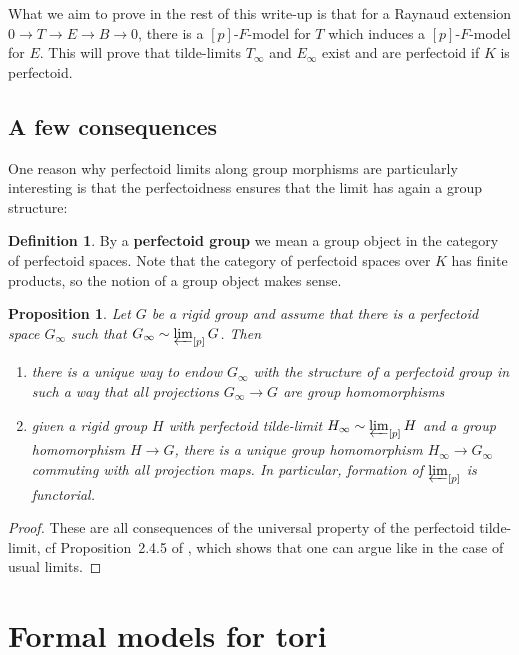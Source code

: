 \documentclass[10pt,oneside]{amsart}
\newtheorem{proposition}[theorem]{Proposition}
\theoremstyle{definition}
\newtheorem{definition}[theorem]{Definition}
\theoremstyle{remark}
\begin{document}
	
	What we aim to prove in the rest of this write-up is that for a Raynaud extension $0\rightarrow T\rightarrow E\rightarrow B\rightarrow 0$, there is a $[p]$-$F$-model for $T$ which induces a $[p]$-$F$-model for $E$. This will prove that tilde-limits $T_\infty$ and $E_\infty$ exist and are perfectoid if $K$ is perfectoid.
	
	\subsection{A few consequences}
	
	One reason why perfectoid limits along group morphisms are particularly interesting is that the perfectoidness ensures that the limit has again a group structure:
	
	\begin{definition}
		By a \textbf{perfectoid group} we mean a group object in the category of perfectoid spaces.
		Note that the category of perfectoid spaces over $K$ has finite products, so the notion of a group object makes sense. 
	\end{definition}
	
	\begin{proposition}\label{perfectoid tilde limit is perfectoid group in a functorial way}
		Let $G$ be a rigid group and assume that there is a perfectoid space $G_\infty$ such that $G_\infty \sim \varprojlim_{[p]} G$. Then
		\begin{enumerate}
		\item  there is a unique way to endow $G_\infty$ with the structure of a perfectoid group in such a way that all projections $G_\infty\rightarrow G$ are group homomorphisms
		\item given a rigid group $H$ with perfectoid tilde-limit $H_\infty\sim\varprojlim_{[p]}H$ and a group homomorphism $H\rightarrow G$, there is a unique group homomorphism $H_\infty\rightarrow G_\infty$
		commuting with all projection maps. In particular, formation of $\varprojlim_{[p]}$ is functorial.
	\end{enumerate}
	\end{proposition}
	\begin{proof}
		These are all consequences of the universal property of the perfectoid tilde-limit, cf Proposition~2.4.5 of \cite{SW}, which shows that one can argue like in the case of usual limits.
	\end{proof}
	
	\section{Formal models for tori}
	
\end{document}
